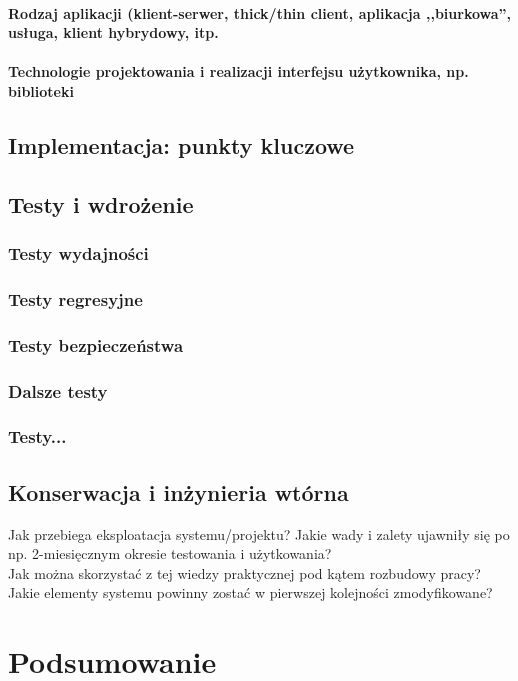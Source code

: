 \documentclass[twoside,12pt]{report}
\begin{document}
\subsubsection{Rodzaj aplikacji (klient-serwer, thick/thin client, aplikacja
,,biurkowa'', usługa, klient hybrydowy, itp.}
\subsubsection{Technologie projektowania i realizacji interfejsu użytkownika,
np. biblioteki}


\section{Implementacja: punkty kluczowe}

\section{Testy i wdrożenie}
\subsection{Testy wydajności}
\subsection{Testy regresyjne}
\subsection{Testy bezpieczeństwa}
\subsection{Dalsze testy}
\subsection{Testy...}

\section{Konserwacja i inżynieria wtórna}
Jak przebiega eksploatacja systemu/projektu? Jakie wady i zalety ujawniły się po
np. 2-miesięcznym okresie testowania i użytkowania? \\
\indent Jak można skorzystać z tej wiedzy praktycznej pod kątem roz\-bu\-do\-wy pracy? Jakie elementy systemu powinny zostać w pierwszej kolejności zmodyfikowane?  

\chapter{Podsumowanie}
\end{document}

